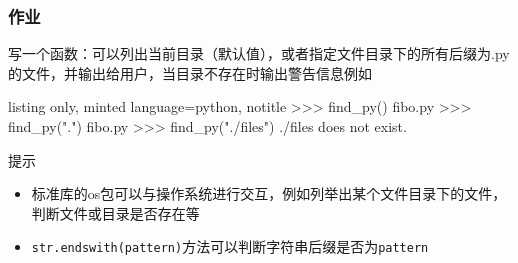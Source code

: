 \documentclass[10pt]{beamer}
\begin{document}
\begin{frame}[fragile]
    \frametitle{作业}

    写一个函数：可以列出当前目录（默认值），或者指定文件目录下的所有后缀为.py的文件，并输出给用户，当目录不存在时输出警告信息例如

    \begin{tcblisting}{listing only, minted language=python, notitle}
>>> find_py()
fibo.py
>>> find_py(".")
fibo.py
>>> find_py("./files")
./files does not exist.\end{tcblisting}

\begin{block}{提示}
    \begin{itemize}
        \item 标准库的os包可以与操作系统进行交互，例如列举出某个文件目录下的文件，判断文件或目录是否存在等
        \item \texttt{str.endswith(pattern)}方法可以判断字符串后缀是否为\texttt{pattern}
    \end{itemize}
\end{block}
\end{frame}
\end{document}
